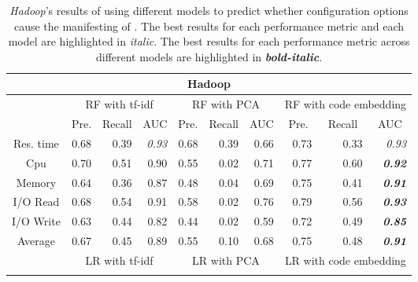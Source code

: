 \begin{table*}
\centering
\caption{\emph{Hadoop}'s results of using different models to predict whether configuration options cause the manifesting of \inconsistent. The best results for each performance metric and each model are highlighted in \textit{italic}. The best results for each performance metric across different models are highlighted in \textbf{\textit{bold-italic}}.} %

\begin{tabular}{|c|r|r|r|r|r|r|r|r|r|}
\hline
\multicolumn{10}{|c|}{Hadoop}    \\ \hline
\multirow{2}{*}{} & \multicolumn{3}{c|}{RF with tf-idf}        & \multicolumn{3}{c|}{RF with PCA}           & \multicolumn{3}{c|}{RF with code embedding}\\ \cline{2-10} 
                  & \multicolumn{1}{c|}{Pre.} & \multicolumn{1}{c|}{Recall} & \multicolumn{1}{c|}{AUC} & \multicolumn{1}{c|}{Pre.} & \multicolumn{1}{c|}{Recall} & \multicolumn{1}{c|}{AUC} & \multicolumn{1}{c|}{Pre.} & \multicolumn{1}{c|}{Recall} & \multicolumn{1}{c|}{AUC} \\ \hline
Res. time         & 0.68  & 0.39    & \textit{0.93}            & 0.68  & 0.39    & 0.66 & 0.73  & 0.33    & \textit{0.93}            \\ \hline
Cpu               & 0.70  & 0.51    & 0.90 & 0.55  & 0.02    & 0.71 & 0.77  & 0.60    & \textit{\textbf{0.92}}   \\ \hline
Memory            & 0.64  & 0.36    & 0.87 & 0.48  & 0.04    & 0.69 & 0.75  & 0.41    & \textit{\textbf{0.91}}   \\ \hline
I/O Read          & 0.68  & 0.54    & 0.91 & 0.58  & 0.02    & 0.76 & 0.79  & 0.56    & \textit{\textbf{0.93}}   \\ \hline
I/O Write         & 0.63  & 0.44    & 0.82 & 0.44  & 0.02    & 0.59 & 0.72  & 0.49    & \textit{\textbf{0.85}}   \\ \hline
Average           & 0.67  & 0.45    & 0.89 & 0.55  & 0.10    & 0.68 & 0.75  & 0.48    & \textit{\textbf{0.91}}   \\ \hline
\multirow{2}{*}{} & \multicolumn{3}{c|}{LR with tf-idf}        & \multicolumn{3}{c|}{LR with PCA}           & \multicolumn{3}{c|}{LR with code embedding}\\ \cline{2-10} 

\end{tabular}
\end{table*}

